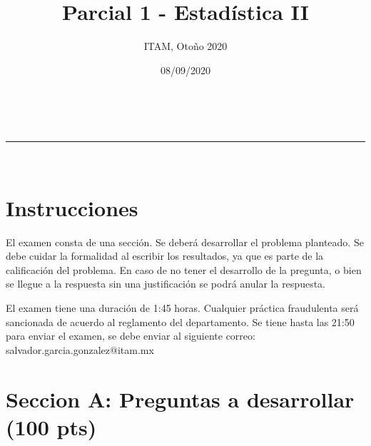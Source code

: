 \documentclass[addpoints]{exam}
\makeatletter
\newcommand{\linia}{\rule{\linewidth}{0.5pt}}
\theoremstyle{mytheor}
\renewcommand{\maketitle}{
    \begin{center}
    \vspace{2ex}
    {\huge \textsc{\@title}}
    \vspace{1ex}
    \\
    \linia\\
    \@author \hfill \@date
    \vspace{4ex}
    \end{center}
  }
\makeatother
\begin{document}
  
  \title{Parcial 1 - Estadística II}
  
  \author{ITAM, Otoño 2020}
  
  \date{08/09/2020}
  
  \maketitle
  
  \section*{Instrucciones}
  

 El examen consta de una sección. Se deberá desarrollar el problema planteado. Se debe cuidar la formalidad al escribir los resultados, ya que es parte de la calificación del problema. En caso de no tener el desarrollo de la pregunta, o bien se llegue a la respuesta sin una justificación se podrá anular la respuesta. 
  
  \vspace{10pt}
  
El examen tiene una duración de 1:45 horas. Cualquier práctica fraudulenta será sancionada de acuerdo al reglamento del departamento. Se tiene hasta las 21:50 para enviar el examen, se debe enviar al siguiente correo: salvador.garcia.gonzalez@itam.mx


  \section*{Seccion A: Preguntas a desarrollar (100 pts)}
  
\end{document}
